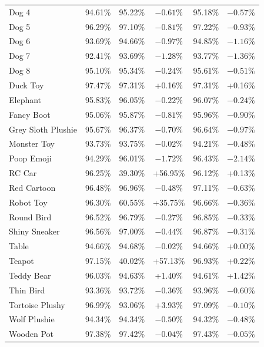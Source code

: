 \documentclass[journal,12pt,onecolumn,draftclsnofoot]{IEEEtran}
\begin{document}
\begin{longtable}{l c c c c c}
Dog 4 & 94.61\% & 95.22\% & $-0.61\%$ & 95.18\% & $-0.57\%$ \\
Dog 5 & 96.29\% & 97.10\% & $-0.81\%$ & 97.22\% & $-0.93\%$ \\
Dog 6 & 93.69\% & 94.66\% & $-0.97\%$ & 94.85\% & $-1.16\%$ \\
Dog 7 & 92.41\% & 93.69\% & $-1.28\%$ & 93.77\% & $-1.36\%$ \\
Dog 8 & 95.10\% & 95.34\% & $-0.24\%$ & 95.61\% & $-0.51\%$ \\
Duck Toy & 97.47\% & 97.31\% & +0.16\% & 97.31\% & +0.16\% \\
Elephant & 95.83\% & 96.05\% & $-0.22\%$ & 96.07\% & $-0.24\%$ \\
Fancy Boot & 95.06\% & 95.87\% & $-0.81\%$ & 95.96\% & $-0.90\%$ \\
Grey Sloth Plushie & 95.67\% & 96.37\% & $-0.70\%$ & 96.64\% & $-0.97\%$ \\
Monster Toy & 93.73\% & 93.75\% & $-0.02\%$ & 94.21\% & $-0.48\%$ \\
Poop Emoji & 94.29\% & 96.01\% & $-1.72\%$ & 96.43\% & $-2.14\%$ \\
RC Car & 96.25\% & 39.30\% & +56.95\% & 96.12\% & +0.13\% \\
Red Cartoon & 96.48\% & 96.96\% & $-0.48\%$ & 97.11\% & $-0.63\%$ \\
Robot Toy & 96.30\% & 60.55\% & +35.75\% & 96.66\% & $-0.36\%$ \\
Round Bird & 96.52\% & 96.79\% & $-0.27\%$ & 96.85\% & $-0.33\%$ \\
Shiny Sneaker & 96.56\% & 97.00\% & $-0.44\%$ & 96.87\% & $-0.31\%$ \\
Table & 94.66\% & 94.68\% & $-0.02\%$ & 94.66\% & +0.00\% \\
Teapot & 97.15\% & 40.02\% & +57.13\% & 96.93\% & +0.22\% \\
Teddy Bear & 96.03\% & 94.63\% & +1.40\% & 94.61\% & +1.42\% \\
Thin Bird & 93.36\% & 93.72\% & $-0.36\%$ & 93.96\% & $-0.60\%$ \\
Tortoise Plushy & 96.99\% & 93.06\% & +3.93\% & 97.09\% & $-0.10\%$ \\
Wolf Plushie & 94.34\% & 94.34\% & $-0.50\%$ & 94.32\% & $-0.48\%$ \\
Wooden Pot & 97.38\% & 97.42\% & $-0.04\%$ & 97.43\% & $-0.05\%$ \\
\end{longtable}
\normalsize
\end{document}
